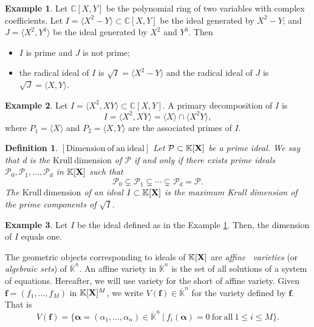 \documentclass[11pt]{article}
\numberwithin{Property}{section}
\numberwithin{Theorem}{section}
\numberwithin{Proposition}{section}
\numberwithin{Lemma}{section}
\numberwithin{Corollary}{section}
\newtheorem{Definition}{Definition}%
\numberwithin{Definition}{section}
\numberwithin{Remark}{section}
\numberwithin{Conjecture}{section}
\numberwithin{Problem}{section}
\numberwithin{Claim}{section}
\theoremstyle{definition}
\newtheorem{Example}{Example}%
\numberwithin{Example}{section}
\def\f {\ensuremath{\mathbf{f}}}
\renewcommand{\leq}{\leqslant}
\def\bar{\overline}
\newcommand{\field}{\mathbb{K}} %
\newcommand{\mat}[1]{\mathbf{\MakeUppercase{#1}}} %
\newcommand{\todo}[1]{\textcolor{red}{#1}} %
\begin{document}
\begin{Example}\label{Ex1} Let $\mathbb{C}[X,Y]$ be the polynomial ring of two variables with complex coefficients. Let $I = \langle X^2 - Y\rangle \subset \mathbb{C}[X,Y]$ be the ideal generated by $X^2 - Y$; and $J = \langle X^2, Y^3\rangle$ be the ideal generated by $X^2$ and $Y^3$. Then 
\begin{itemize}
\item $I$ is prime and $J$ is not prime;
\item the radical ideal of $I$ is $\sqrt{I} = \langle X^2 - Y\rangle$ and the radical ideal of $J$ is $\sqrt{J} = \langle X,Y \rangle$. 
\end{itemize}
\end{Example}
\begin{Example}
Let $I = \langle X^2, XY \rangle \subset \mathbb{C}[X,Y]$. A primary decomposition of $I$ is 
\[
I = \langle X^2, XY \rangle = \langle X \rangle \cap \langle X^2Y \rangle, 
\] where $P_1 = \langle X \rangle$ and $P_2 =  \langle X,Y \rangle$ are the associated primes of $I$. 
\end{Example}
\begin{Definition} $\mathrm{[Dimension \ of \ an \ ideal]}$ Let $\mathcal{P} \subset \field[\mat{X}]$ be a prime ideal. We say that d is the $\mathrm{Krull \ dimension }$ of $\mathcal{P}$ if and only if there exists prime ideals $\mathcal{P}_0, \mathcal{P}_1, \ldots, \mathcal{P}_d$ in $\field[\mat{X}]$ such that 
\[
\mathcal{P}_0 \subsetneq \mathcal{P}_1 \subsetneq \cdots \subsetneq \mathcal{P}_d = \mathcal{P}.
\] 
The $\mathrm{Krull \ dimension}$ of an ideal $I \subset \field[\mat{X}]$ is the maximum Krull dimension of the prime components of $\sqrt{I}$. 
\end{Definition} 
\begin{Example} Let $I$ be the ideal defined as in the Example \ref{Ex1}. Then, the dimension of $I$ equals one. 
\end{Example}
The geometric objects corresponding to ideals of $\field[\mat{X}]$ are \emph{affine \ varieties} (or \emph{algebraic sets}) of $\bar{\field}^n$. An affine variety in $\bar{\field}^n$ is the set of all solutions of a system of equations. Hereafter, we will use variety for the short of affine variety. Given $\f = (f_1, \ldots, f_M)$ in $\field[\mat{X}]^M$, we write $V(\f) \in \bar{\field}^n$ for the variety defined by $\f$. That is 
\[
V(\f) = \{{\bm \alpha} = (\alpha_1, \ldots, \alpha_n) \in \bar{\field}^n \ | \ f_i({\bm \alpha}) = 0 \ \mathrm{for \ all} \ 1 \leq i \leq M\}. 
\]
\end{document}
